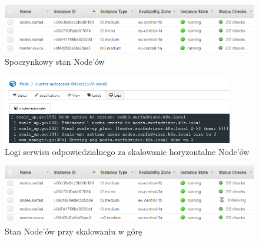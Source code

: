\begin{figure}[!ht]
	\begin{center}
		\includegraphics[width=1\textwidth]{img/autoscaling/ca-normal}
	\end{center}
    \caption{Spoczynkowy stan Node'ów}
\end{figure}

\begin{figure}[!ht]
	\begin{center}
		\includegraphics[width=0.9\textwidth]{img/autoscaling/ca-scale-up-logs}
	\end{center}
    \caption{Logi serwisu odpowiedzialnego za skalowanie horyzontalne Node'ów}
\end{figure}

\begin{figure}[!ht]
	\begin{center}
		\includegraphics[width=1\textwidth]{img/autoscaling/ca-scale-up}
	\end{center}
    \caption{Stan Node'ów przy skalowaniu w górę}
\end{figure}
